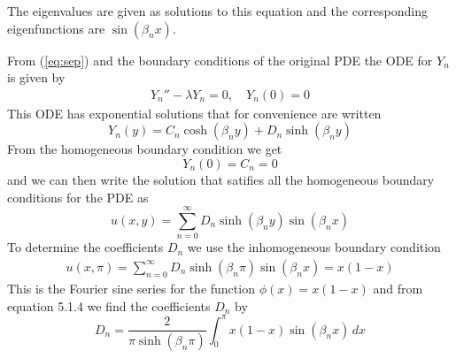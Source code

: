     The eigenvalues are given as solutions to this equation and the corresponding eigenfunctions are $\sin(\beta_n x)$. \par
    From (\ref{eq:sep}) and the boundary conditions of the original PDE the ODE for $Y_n$ is given by
    \begin{gather*}
        Y_n'' - \lambda Y_n = 0,\quad Y_n(0) = 0
    \end{gather*}
    This ODE has exponential solutions that for convenience are written
    \begin{equation*}
        Y_n(y) = C_n\cosh(\beta_n y) + D_n\sinh(\beta_n y)
    \end{equation*}
    From the homogeneous boundary condition we get
    \begin{equation*}
        Y_n(0) = C_n = 0
    \end{equation*}
    and we can then write the solution that satifies all the homogeneous boundary conditions for the PDE as
    \begin{equation*}
        u(x,y) = \sum_{n=0}^\infty D_n\sinh(\beta_n y)\sin(\beta_n x)
    \end{equation*}
    To determine the coefficients $D_n$ we use the inhomogeneous boundary condition
    \begin{align*}
        u(x,\pi) = \sum_{n=0}^\infty D_n\sinh(\beta_n \pi)\sin(\beta_n x) = x(1-x)
    \end{align*}
    This is the Fourier sine series for the function $\phi(x)=x(1-x)$ and from equation 5.1.4 we find the coefficients $D_n$ by
    \begin{equation*}
        D_n = \frac{2}{\pi\sinh(\beta_n\pi)}\int_0^\pi x(1-x)\sin(\beta_n x)\,dx
    \end{equation*}

